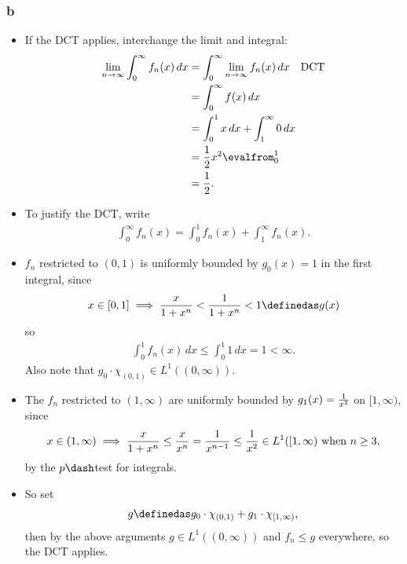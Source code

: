 \begin{solution}
\hypertarget{b-11}{%
\subsubsection{b}\label{b-11}}

\begin{itemize}
\item
  If the DCT applies, interchange the limit and integral:
  \begin{align*}
    \lim_{n\to\infty }\int_0^\infty f_n(x)\, dx 
  &= \int_0^\infty \lim_{n\to\infty}f_n(x) \, dx \quad\text{DCT}\\
    &=\int_0^\infty f(x) \,dx \\
    &= \int_0^1 x \,dx + \int_1^\infty 0\, dx \\
    &= {1\over 2}x^2 \evalfrom_0^1 \\
    &= {1\over 2}
    .\end{align*}
\item
  To justify the DCT, write
  \begin{align*}
  \int_0^\infty f_n(x)
  = \int_0^1 f_n(x) + \int_1^\infty f_n(x)
  .\end{align*}
\item
  \(f_n\) restricted to \((0, 1)\) is uniformly bounded by
  \(g_0(x) = 1\) in the first integral, since
  \begin{align*}
  x \in [0, 1] \implies \frac{x}{1+x^n} < \frac{1}{1+x^n} < 1 \definedas g(x)
  \end{align*} so
  \begin{align*}
  \int_0^1 f_n(x)\,dx \leq \int_0^1 1 \,dx = 1 < \infty
  .\end{align*} Also note that
  \(g_0\cdot \chi_{(0, 1)} \in L^1((0, \infty))\).
\item
  The \(f_n\) restricted to \((1, \infty)\) are uniformly bounded by
  \(g_1(x) = {1\over x^{2}}\) on \([1, \infty)\), since
  \begin{align*}
  x \in (1, \infty) \implies \frac{x}{1+x^n} \leq {x \over x^n} = {1 \over x^{n-1}} \leq {1\over x^2}\in L^1([1, \infty) \text{ when } n\geq 3
  ,\end{align*} by the \(p\dash\)test for integrals.
\item
  So set
  \begin{align*}g \definedas g_0 \cdot \chi_{(0, 1)} + g_1 \cdot \chi_{[1, \infty)},\end{align*}
  then by the above arguments \(g \in L^1((0, \infty))\) and
  \(f_n \leq g\) everywhere, so the DCT applies.
\end{itemize}

\end{solution}


